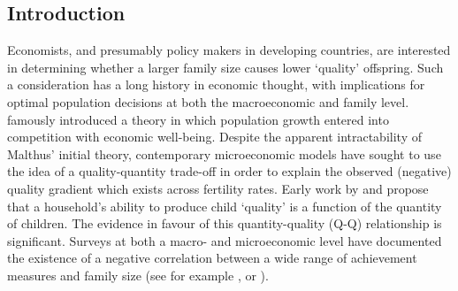 \documentclass{article}[11pt,subeqn]
\begin{document}
\begin{spacing}{1.5}	

\begin{abstract}
Given the endogenous nature of a family's fertility decisions, demonstrating the existence of a trade-off between child quality and child quantity requires the identification of a 
valid exclusion restriction in a quality-quantity model.  Prior work has suggested that multiple births are an appropriate manner to estimate this relationship.  I show that twin 
births are \emph{not} exogenous in a developing country setting, invalidating the identifying assumption of this methodology in this situation.  Instead twin birth depends on a 
range of observable (and potentially unobservable) 
characteristics of the mother, such as height, BMI, and family income.  The effect of this result on typical 2SLS estimates is then examined via Monte Carlo simulation, and 
empirically using pooled results from the Demographic and Health Surveys, a dataset consisting of more that 1,000,000 children from 44 developing countries.  Given the poor 
performance of these estimates under simulation, an alternative methodology is employed to determine the plausibility of family size having any effect on child quality.  This
methodology provides some evidence that higher sibship reduces total educational attainment in a low income setting, but suggests that family size has less effect on child
attendance.
\end{abstract}

\section{Introduction}
\label{scn:intro}
Economists, and presumably policy makers in developing countries, are interested in determining whether a larger family size causes lower `quality' offspring.  Such a consideration
 has a long history in economic thought, with implications for optimal population decisions at both the macroeconomic and family level.  
\citet{Malthus1798} famously introduced a theory in which population 
growth entered into competition with economic well-being.  Despite the apparent intractability of Malthus' initial theory, contemporary microeconomic models have sought to use 
the idea of a quality-quantity trade-off in order to explain the observed (negative) quality gradient which exists across fertility rates.  Early work by \citet{BeckerLewis1973} 
and \citet{BeckerTomes1976} propose that a household's ability to produce child `quality' is a function of the quantity of children.  The evidence in favour of this quantity-quality 
(Q-Q) relationship is significant.  Surveys at both a macro- and microeconomic level have documented the existence of a negative correlation between a wide range of achievement 
measures and family size (see for example \cite{Desai1995}, or \cite{Hanushek1992}).


\end{spacing}
\end{document}
